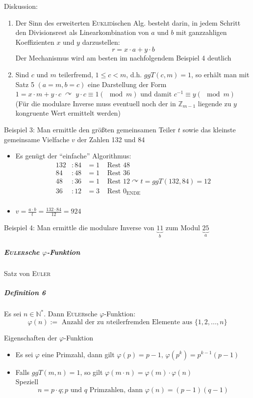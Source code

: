 \documentclass[a4paper]{scrartcl}
\begin{document}
Diskussion:
\begin{enumerate}
\item Der Sinn des erweiterten \textsc{Euklid}ischen Alg. besteht darin, in jedem Schritt den Divisionsrest als Linearkombination von $a$ und $b$ mit ganzzahligen Koeffizienten $x$ und $y$ darzustellen:
\[ r = x\cdot a + y\cdot b\]
Der Mechanismus wird am besten im nachfolgendem Beispiel 4 deutlich
\item Sind $c$ und $m$ teilerfremd, $1\leq c < m$, d.h. $ggT(c,m)=1$, so erhält man mit Satz 5 $(a=m,b=c)$ eine Darstellung der Form $1=x\cdot m + y\cdot c \; \curvearrowright \; y\cdot c \equiv 1 (\mod{m})$ und damit $c^{-1} \equiv y (\mod{m})$\\
(Für die modulare Inverse muss eventuell noch der in $\mathbb{Z}_{m-1}$ liegende zu $y$ kongruente Wert ermittelt werden)
\end{enumerate}

Beispiel 3: Man ermittle den größten gemeinsamen Teiler $t$ sowie das kleinste gemeinsame Vielfache $v$ der Zahlen 132 und 84
\begin{itemize}
\item Es genügt der "`einfache"' Algorithmus:\\
\begin{align*}
132&:84&=1 &\text{ Rest } 48\\
84 &: 48 &=1 &\text{ Rest } 36\\
48 &: 36&=1 &\text{ Rest } 12 \curvearrowright t=ggT(132,84)=12\\
36&:12&=3 &\text{ Rest } 0_{\text{ENDE}}\\
\end{align*}

\item $v=\frac{a\cdot b}{t} = \frac{132\cdot 84}{12} = 924$
\end{itemize}

Beispiel 4: Man ermittle die modulare Inverse von $\underbrace{11}_{b}$ zum Modul $\underbrace{25}_{a}$

\subparagraph{\textsc{Euler}sche $\varphi$-Funktion} Satz von \textsc{Euler}
\subparagraph{Definition 6} Es sei $n\in \mathbb{N}^*$. Dann \textsc{Euler}sche $\varphi$-Funktion:
\[\varphi (n):= \text{ Anzahl der zu } n \text{teilerfremden Elemente aus } \{1,2,...,n\}\]

Eigenschaften der $\varphi$-Funktion
\begin{itemize}
\item Es sei $\varphi$ eine Primzahl, dann gilt $\varphi (p)=p-1, \, \varphi (p^k)=p^{k-1}(p-1)$
\item Falls $ggT(m,n)=1$, so gilt $\varphi(m\cdot n)=\varphi (m) \cdot \varphi (n)$\\
Speziell \begin{equation} \label{RSA1} n=p\cdot q; p \text{ und } q \text{ Primzahlen, dann } \varphi (n) = (p-1) (q-1)\end{equation}
\end{itemize}
\end{document}

